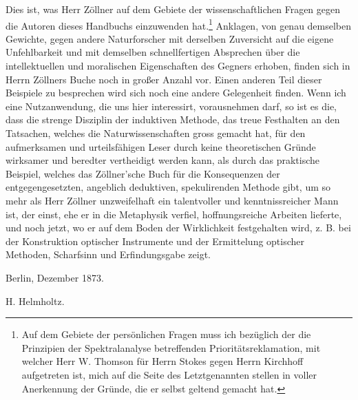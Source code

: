 \documentclass[a4paper, 11pt, oneside, german]{article}
\begin{document}
Dies ist, was Herr Zöllner auf dem Gebiete der wissenschaftlichen Fragen gegen die Autoren dieses Handbuchs einzuwenden hat.\footnote{Auf dem Gebiete der persönlichen Fragen muss ich bezüglich der die Prinzipien der Spektralanalyse betreffenden Prioritätsreklamation, mit welcher Herr W. Thomson für Herrn Stokes gegen Herrn Kirchhoff aufgetreten ist, mich auf die Seite des Letztgenannten stellen in voller Anerkennung der Gründe, die er selbst geltend gemacht hat.} Anklagen, von genau demselben Gewichte, gegen andere Naturforscher mit derselben Zuversicht auf die eigene Unfehlbarkeit und mit demselben schnellfertigen Absprechen über die intellektuellen und moralischen Eigenschaften des Gegners erhoben, finden sich in Herrn Zöllners Buche noch in großer Anzahl vor. Einen anderen Teil dieser Beispiele zu besprechen wird sich noch eine andere Gelegenheit finden. Wenn ich eine Nutzanwendung, die uns hier interessirt, vorausnehmen darf, so ist es die, dass die strenge Disziplin der induktiven Methode, das treue Festhalten an den Tatsachen, welches die Naturwissenschaften gross gemacht hat, für den aufmerksamen und urteilsfähigen Leser durch keine theoretischen Gründe wirksamer und beredter vertheidigt werden kann, als durch das praktische Beispiel, welches das Zöllner'sche Buch für die Konsequenzen der entgegengesetzten, angeblich deduktiven, spekulirenden Methode gibt, um so mehr als Herr Zöllner unzweifelhaft ein talentvoller und kenntnissreicher Mann ist, der einst, ehe er in die Metaphysik verfiel, hoffnungsreiche Arbeiten lieferte, und noch jetzt, wo er auf dem Boden der Wirklichkeit festgehalten wird, z. B. bei der Konstruktion optischer Instrumente und der Ermittelung optischer Methoden, Scharfsinn und Erfindungsgabe zeigt.

\bigskip

Berlin, Dezember 1873.

\hspace*{15mm}H. Helmholtz.
\clearpage
\end{document}
